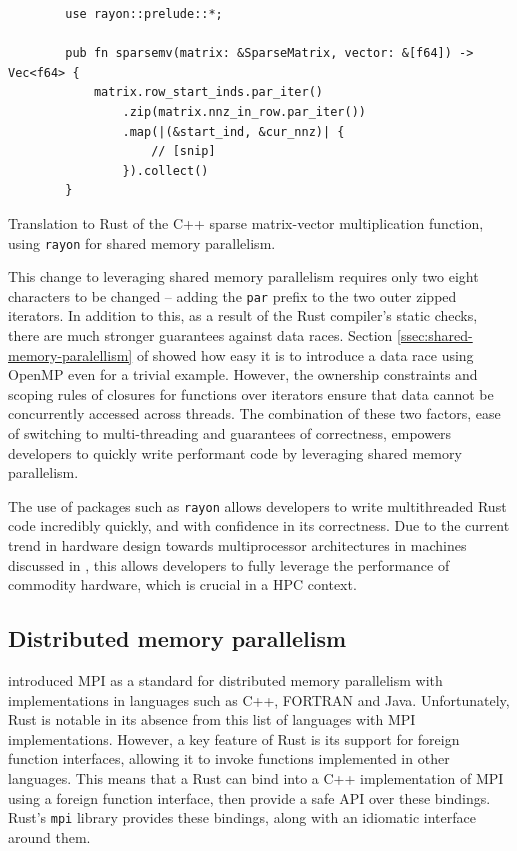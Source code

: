 \begin{code}
    \begin{verbatim}
        use rayon::prelude::*;
        
        pub fn sparsemv(matrix: &SparseMatrix, vector: &[f64]) -> Vec<f64> {
            matrix.row_start_inds.par_iter()
                .zip(matrix.nnz_in_row.par_iter())
                .map(|(&start_ind, &cur_nnz)| {
                    // [snip]
                }).collect()
        }
    \end{verbatim}
    \caption{Translation to Rust of the C++ sparse matrix-vector multiplication function, using \texttt{rayon} for shared memory parallelism.}
    \label{listing:rust-sparsemv-rayon}
\end{code}

This change to leveraging shared memory parallelism requires only two eight characters to be changed -- adding the \texttt{par} prefix to the two outer zipped iterators. In addition to this, as a result of the Rust compiler's static checks, there are much stronger guarantees against data races. Section \ref{ssec:shared-memory-paralellism} of  showed how easy it is to introduce a data race using OpenMP even for a trivial example. However, the ownership constraints and scoping rules of closures for functions over iterators ensure that data cannot be concurrently accessed across threads. The combination of these two factors, ease of switching to multi-threading and guarantees of correctness, empowers developers to quickly write performant code by leveraging shared memory parallelism.

The use of packages such as \texttt{rayon} allows developers to write multithreaded Rust code incredibly quickly, and with confidence in its correctness. Due to the current trend in hardware design towards multiprocessor architectures in machines discussed in , this allows developers to fully leverage the performance of commodity hardware, which is crucial in a \acrshort{HPC} context.

\subsection{Distributed memory parallelism}
\label{sec:translation-mpi}

 introduced MPI as a standard for distributed memory parallelism with implementations in languages such as C++, FORTRAN and Java. Unfortunately, Rust is notable in its absence from this list of languages with MPI implementations. However, a key feature of Rust is its support for foreign function interfaces, allowing it to invoke functions implemented in other languages. This means that a Rust can bind into a C++ implementation of MPI using a foreign function interface, then provide a safe API over these bindings. Rust's \texttt{mpi} library \cite{noauthor_rsmpirsmpi_2024} %
provides these bindings, along with an idiomatic interface around them.

